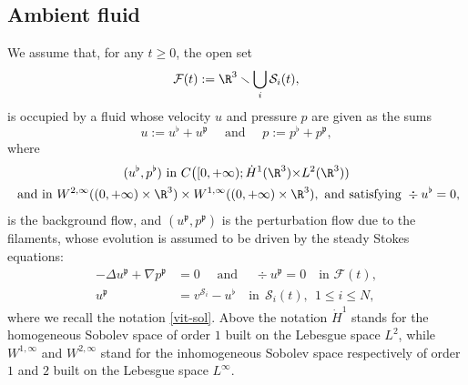 \subsection{Ambient fluid}
We assume that, for any $t\geq0$,
the open set
\[
\mathcal{F}(t) := \R^3 \smallsetminus \bigcup_i \mathcal S_i (t),\]
is occupied by a fluid whose velocity $u$ and pressure $p$ are given as the sums
\begin{equation}
\label{vit-tot}
u := u^\flat + u^\mathfrak{p} \quad \text{ and } \quad p := p^\flat + p^\mathfrak{p},
\end{equation}
where
\begin{multline} \label{regover}
(u^\flat,p^\flat) \text{ in }
C \big([0, {+ \infty});{\dot H^1 (\R^3) {\times L^2(\R^3)} }) \\ \text{ and in } W^{2,\infty}((0,+\infty)\times \R^3) \times W^{1,\infty}((0,+\infty)\times \R^3),
\text{ and satisfying } \div u^\flat = 0,
\end{multline}
is the background flow, and $(u^\mathfrak{p}, p^\mathfrak{p})$
is the perturbation flow due to the filaments, whose evolution is assumed to be driven by the steady Stokes equations:
\begin{subequations}
\label{intrau-tot}
\begin{align}
\label{intrau1}
- \Delta u^\mathfrak{p} + \nabla p^\mathfrak{p} &=0 \quad \text{ and } \quad \div u^\mathfrak{p} = 0 \quad \text{in }\mathcal{F}(t), \\
\label{intrau1bis}
u^\mathfrak{p} &= v^{{\mathcal S}_i} - u^\flat \quad \text{in}\ \ \mathcal{S}_i (t), \ \ 1 \leq i \leq N,
\end{align}
\end{subequations}
where we recall the notation \eqref{vit-sol}.
Above the notation ${\dot H^1 } $ stands for the homogeneous Sobolev space of order $1$ built on the Lebesgue space $L^2$, while $W^{1,\infty}$ and $W^{2,\infty}$ stand for the inhomogeneous Sobolev space respectively of order $1$ and $2$ built on the Lebesgue space $L^\infty$.

